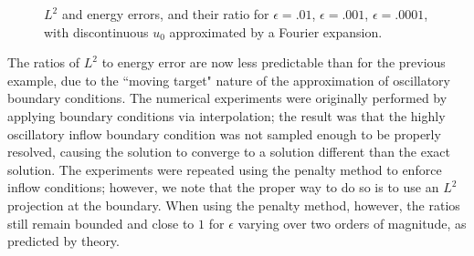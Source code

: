 \documentclass[11pt,onecolumn]{scrartcl}
\begin{document}
\begin{figure}[h!]
\centering
{}
\caption{$L^2$ and energy errors, and their ratio for $\epsilon=.01$, $\epsilon=.001$, $\epsilon=.0001$, with discontinuous $u_0$ approximated by a Fourier expansion. }
\label{disc_sol_fourier}
\end{figure}
The ratios of $L^2$ to energy error are now less predictable than for the previous example, due to the ``moving target" nature of the approximation of oscillatory boundary conditions. The numerical experiments were originally performed by applying boundary conditions via interpolation; the result was that the highly oscillatory inflow boundary condition was not sampled enough to be properly resolved, causing the solution to converge to a solution different than the exact solution.  The experiments were repeated using the penalty method to enforce inflow conditions; however, we note that the proper way to do so is to use an $L^2$ projection at the boundary.  When using the penalty method, however, the ratios still remain bounded and close to $1$ for $\epsilon$ varying over two orders of magnitude, as predicted by theory. 
\end{document}
